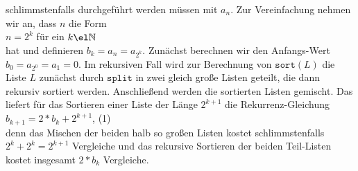 schlimmstenfalls durchgef\"uhrt werden m\"ussen mit $a_n$.  Zur Vereinfachung nehmen wir an, dass $n$ die Form \\[0.1cm]
\hspace*{1.3cm} $\displaystyle n = 2^k$ \qquad f\"ur ein $k \el \mathbb{N}$ \\[0.1cm]
hat und definieren $b_k = a_n = a_{2^k}$.  Zun\"achst berechnen wir den Anfangs-Wert
$\displaystyle b_0 = a_{2^0} = a_1 = 0$.  Im rekursiven Fall wird zur Berechnung
von $\mathtt{sort}(L)$ die Liste $L$ zun\"achst durch $\texttt{split}$ in zwei
gleich gro\ss{}e Listen geteilt, die dann rekursiv sortiert werden. Anschlie\ss{}end
werden die sortierten Listen
gemischt.  Das liefert f\"ur das Sortieren einer Liste der L\"ange $2^{k+1}$ die Rekurrenz-Gleichung \\[0.1cm]
\hspace*{1.3cm} $b_{k+1} = 2 * b_k + 2^{k+1}$, \hspace*{\fill} (1) \\[0.1cm]
denn das Mischen der beiden halb so gro\ss{}en Listen kostet schlimmstenfalls $2^k +
2^k = 2^{k+1}$ Vergleiche und das rekursive Sortieren 
der beiden Teil-Listen
kostet insgesamt $2*b_k$ Vergleiche.

